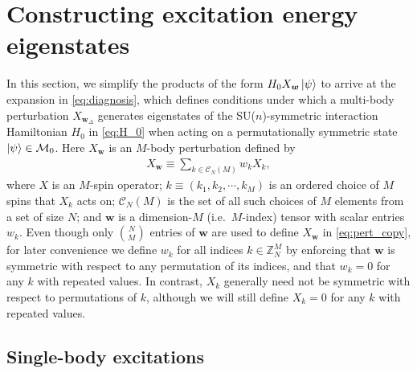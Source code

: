 \documentclass[nofootinbib,notitlepage,11pt]{revtex4-2}
\newcommand{\p}[1]{\left(#1\right)} %
\newcommand{\m}{\bm} %
\newcommand{\1}{\mathds{1}}
\newcommand{\C}{\mathcal{C}}
\newcommand{\M}{\mathcal{M}}
\newcommand{\ZZ}{\mathbb{Z}}
\begin{document}
\section{Constructing excitation energy eigenstates}
\label{sec:eigenstates}

In this section, we simplify the products of the form
$H_0X_{\m w}\ket\psi$ to arrive at the expansion in
\eqref{eq:diagnosis}, which defines conditions under which a
multi-body perturbation $X_{\m w_\Delta}$ generates eigenstates of the
SU($n$)-symmetric interaction Hamiltonian $H_0$ in \eqref{eq:H_0} when
acting on a permutationally symmetric state $\ket\psi\in\M_0$.  Here
$X_{\m w}$ is an $M$-body perturbation defined by
\begin{align}
  X_{\m w} \equiv \sum_{k\in\C_N\p{M}} w_k X_k,
  \label{eq:pert_copy}
\end{align}
where $X$ is an $M$-spin operator; $k\equiv\p{k_1,k_2,\cdots,k_M}$ is
an ordered choice of $M$ spins that $X_k$ acts on; $\C_N\p{M}$ is the
set of all such choices of $M$ elements from a set of size $N$; and
$\m w$ is a dimension-$M$ (i.e.~$M$-index) tensor with scalar entries
$w_k$.  Even though only ${N\choose M}$ entries of $\m w$ are used to
define $X_{\m w}$ in \eqref{eq:pert_copy}, for later convenience we
define $w_k$ for all indices $k\in\ZZ_N^M$ by enforcing that $\m w$ is
symmetric with respect to any permutation of its indices, and that
$w_k=0$ for any $k$ with repeated values.  In contrast, $X_k$
generally need not be symmetric with respect to permutations of $k$,
although we will still define $X_k=0$ for any $k$ with repeated
values.

\subsection{Single-body excitations}
\label{sec:single_body_eigenstates}
\end{document}
